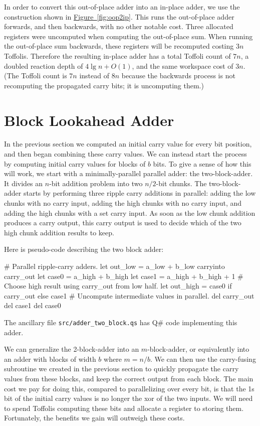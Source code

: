 \documentclass[onecolumn,unpublished]{quantumarticle}
\theoremstyle{definition}
\theoremstyle{definition}
\theoremstyle{definition}
\newcommand{\fig}[1]{\hyperref[fig:#1]{Figure~\ref*{fig:#1}}}
\begin{document}
In order to convert this out-of-place adder into an in-place adder, we use the construction shown in \fig{oop2ip}.
This runs the out-of-place adder forwards, and then backwards, with no other notable cost.
Three allocated registers were uncomputed when computing the out-of-place sum.
When running the out-of-place sum backwards, these registers will be recomputed costing $3n$ Toffolis.
Therefore the resulting in-place adder has a total Toffoli count of $7n$, a doubled reaction depth of $4 \lg n + O(1)$, and the same workspace cost of $3n$.
(The Toffoli count is $7n$ instead of $8n$ because the backwards process is not recomputing the propagated carry bits; it is uncomputing them.)

\section{Block Lookahead Adder}
\label{sec:block}

In the previous section we computed an initial carry value for every bit position, and then began combining these carry values.
We can instead start the process by computing initial carry values for blocks of $b$ bits.
To give a sense of how this will work, we start with a minimally-parallel parallel adder: the two-block-adder.
It divides an $n$-bit addition problem into two $n/2$-bit chunks.
The two-block-adder starts by performing three ripple carry additions in parallel: adding the low chunks with no carry input, adding the high chunks with no carry input, and adding the high chunks with a set carry input.
As soon as the low chunk addition produces a carry output, this carry output is used to decide which of the two high chunk addition results to keep.

Here is pseudo-code describing the two block adder:

\begin{python}
    # Parallel ripple-carry adders.
    let out_low = a_low + b_low carryinto carry_out
    let case0 = a_high + b_high
    let case1 = a_high + b_high + 1
    # Choose high result using carry_out from low half.
    let out_high = case0 if carry_out else case1
    # Uncompute intermediate values in parallel.
    del carry_out
    del case1
    del case0
\end{python}

The ancillary file \texttt{src/adder\_two\_block.qs} has Q\# code implementing this adder.

We can generalize the 2-block-adder into an $m$-block-adder, or equivalently into an adder with blocks of width $b$ where $m=n/b$.
We can then use the carry-fusing subroutine we created in the previous section to quickly propagate the carry values from these blocks, and keep the correct output from each block.
The main cost we pay for doing this, compared to parallelizing over every bit, is that the 1s bit of the initial carry values is no longer the xor of the two inputs.
We will need to spend Toffolis computing these bits and allocate a register to storing them.
Fortunately, the benefits we gain will outweigh these costs.
\end{document}
